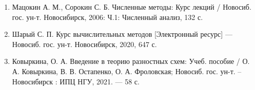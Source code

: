 \documentclass[../main.tex]{subfile}
\begin{document}
\begin{enumerate}[nosep]
	\item Мацокин А. М., Сорокин С. Б. Численные методы: Курс лекций /
		Новосиб. гос. ун-т. Новосибирск, 2006: Ч.1: Численный анализ,
		132 с.
	\item Шарый С. П. Курс вычислительных методов [Электронный ресурс] ---
		Новосиб. гос. ун-т. Новосибирск, 2020, 647 с.
	\item Ковыркина, О. А. Введение в теорию разностных схем: Учеб. пособие
		/ О. А. Ковыркина, В. В. Остапенко, О. А. Фроловская; Новосиб.
		гос. ун-т. -- Новосибирск : ИПЦ НГУ, 2021. — 58 с.
\end{enumerate}
\end{document}
